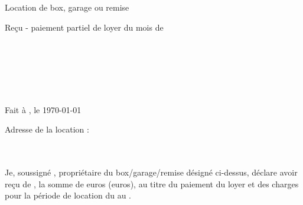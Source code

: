 \documentclass[12pt,a4paper]{article}
\begin{document}
\thispagestyle{empty}

\begin{center}
Location de box, garage ou remise\\
\begin{LARGE}
Reçu - paiement partiel de loyer du mois de \nommois\space\annee
\end{LARGE}
\end{center}
\bigskip

\begin{flushleft}
\nomproprio\\
\adresseproprio\\
\villeproprio
\end{flushleft}

\medskip

\begin{flushright}
\nomlocataire\\
\adresselocataire\\
\villelocataire
\end{flushright}

\medskip

\begin{flushright}
Fait à \lieudocument, le \today
\end{flushright}

\medskip

\begin{flushleft}
Adresse de la location :\\
\adresselocation\\
\lotlocation\\
\villelocation
\end{flushleft}

\medskip

\begin{flushleft}
\-\hspace{0.5cm}Je, soussigné \nomproprio, propriétaire du box/garage/remise désigné ci-dessus, déclare avoir reçu de \nomlocataire, la somme de \montantrecuchiffres\space euros (\montantreculettres\space euros), au titre du paiement du loyer et des charges pour la période de location du \debutmois\space au \finmois\space.
\end{flushleft}

\medskip
\end{document}

